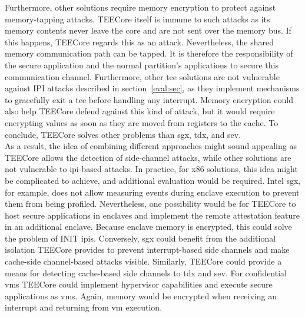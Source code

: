 Furthermore, other solutions require memory encryption to protect against
memory-tapping attacks. TEECore itself is immune to such attacks as its memory
contents never leave the core and are not sent over the memory bus. If this
happens, TEECore regards this as an attack. Nevertheless, the shared memory
communication path can be tapped. It is therefore the responsibility of the
secure application and the normal partition's applications to secure this
communication channel. Furthermore, other \gls{tee} solutions are not vulnerable
against IPI attacks described in section~\ref{eval:sec}, as they implement
mechanisms to gracefully exit a \gls{tee} before handling any interrupt. Memory
encryption could also help TEECore defend against this kind of attack, but it
would require encrypting values as soon as they are moved from registers to the
cache. To conclude, TEECore solves other problems than \gls{sgx}, \gls{tdx}, and
\gls{sev}. \\

As a result, the idea of combining different approaches might sound appealing as
TEECore allows the detection of side-channel attacks, while other solutions are
not vulnerable to \gls{ipi}-based attacks. In practice, for x86 solutions, this
idea might be complicated to achieve, and additional evaluation would be
required. Intel \gls{sgx}, for example, does not allow measuring events during
enclave execution to prevent them from being profiled. Nevertheless, one
possibility would be for TEECore to host secure applications in enclaves and
implement the remote attestation feature in an additional enclave. Because
enclave memory is encrypted, this could solve the problem of INIT \glspl{ipi}.
Conversely, \gls{sgx} could benefit from the additional isolation TEECore
provides to prevent interrupt-based side channels and make cache-side
channel-based attacks visible. Similarly, TEECore could provide a means for
detecting cache-based side channels to \gls{tdx} and \gls{sev}. For confidential
\glspl{vm} TEECore could implement hypervisor capabilities and execute secure
applications as \glspl{vm}. Again, memory would be encrypted when receiving an
interrupt and returning from \gls{vm} execution. \\

